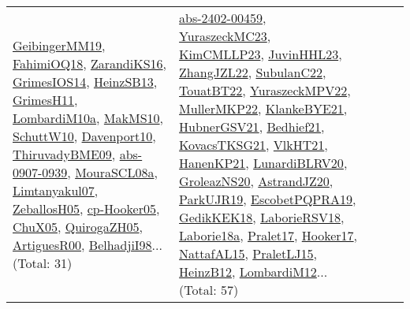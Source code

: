 {\begin{longtable}{lp{3cm}>{\raggedright}p{6cm}>{\raggedright}p{6cm}p{8cm}}
\href{papers/GeibingerMM19.pdf}{GeibingerMM19}\cite{GeibingerMM19}, \href{articles/FahimiOQ18.pdf}{FahimiOQ18}\cite{FahimiOQ18}, \href{articles/ZarandiKS16.pdf}{ZarandiKS16}\cite{ZarandiKS16}, \href{articles/GrimesIOS14.pdf}{GrimesIOS14}\cite{GrimesIOS14}, \href{articles/HeinzSB13.pdf}{HeinzSB13}\cite{HeinzSB13}, \href{papers/GrimesH11.pdf}{GrimesH11}\cite{GrimesH11}, \href{articles/LombardiM10a.pdf}{LombardiM10a}\cite{LombardiM10a}, \href{papers/MakMS10.pdf}{MakMS10}\cite{MakMS10}, \href{papers/SchuttW10.pdf}{SchuttW10}\cite{SchuttW10}, \href{papers/Davenport10.pdf}{Davenport10}\cite{Davenport10}, \href{papers/ThiruvadyBME09.pdf}{ThiruvadyBME09}\cite{ThiruvadyBME09}, \href{articles/abs-0907-0939.pdf}{abs-0907-0939}\cite{abs-0907-0939}, \href{papers/MouraSCL08a.pdf}{MouraSCL08a}\cite{MouraSCL08a}, \href{papers/Limtanyakul07.pdf}{Limtanyakul07}\cite{Limtanyakul07}, \href{articles/ZeballosH05.pdf}{ZeballosH05}\cite{ZeballosH05}, \href{papers/cp-Hooker05.pdf}{cp-Hooker05}\cite{cp-Hooker05}, \href{papers/ChuX05.pdf}{ChuX05}\cite{ChuX05}, \href{papers/QuirogaZH05.pdf}{QuirogaZH05}\cite{QuirogaZH05}, \href{articles/ArtiguesR00.pdf}{ArtiguesR00}\cite{ArtiguesR00}, \href{articles/BelhadjiI98.pdf}{BelhadjiI98}\cite{BelhadjiI98}... (Total: 31) & \href{articles/abs-2402-00459.pdf}{abs-2402-00459}\cite{abs-2402-00459}, \href{papers/YuraszeckMC23.pdf}{YuraszeckMC23}\cite{YuraszeckMC23}, \href{papers/KimCMLLP23.pdf}{KimCMLLP23}\cite{KimCMLLP23}, \href{papers/JuvinHHL23.pdf}{JuvinHHL23}\cite{JuvinHHL23}, \href{papers/ZhangJZL22.pdf}{ZhangJZL22}\cite{ZhangJZL22}, \href{articles/SubulanC22.pdf}{SubulanC22}\cite{SubulanC22}, \href{papers/TouatBT22.pdf}{TouatBT22}\cite{TouatBT22}, \href{articles/YuraszeckMPV22.pdf}{YuraszeckMPV22}\cite{YuraszeckMPV22}, \href{articles/MullerMKP22.pdf}{MullerMKP22}\cite{MullerMKP22}, \href{papers/KlankeBYE21.pdf}{KlankeBYE21}\cite{KlankeBYE21}, \href{articles/HubnerGSV21.pdf}{HubnerGSV21}\cite{HubnerGSV21}, \href{articles/Bedhief21.pdf}{Bedhief21}\cite{Bedhief21}, \href{papers/KovacsTKSG21.pdf}{KovacsTKSG21}\cite{KovacsTKSG21}, \href{articles/VlkHT21.pdf}{VlkHT21}\cite{VlkHT21}, \href{papers/HanenKP21.pdf}{HanenKP21}\cite{HanenKP21}, \href{articles/LunardiBLRV20.pdf}{LunardiBLRV20}\cite{LunardiBLRV20}, \href{papers/GroleazNS20.pdf}{GroleazNS20}\cite{GroleazNS20}, \href{articles/AstrandJZ20.pdf}{AstrandJZ20}\cite{AstrandJZ20}, \href{papers/ParkUJR19.pdf}{ParkUJR19}\cite{ParkUJR19}, \href{articles/EscobetPQPRA19.pdf}{EscobetPQPRA19}\cite{EscobetPQPRA19}, \href{articles/GedikKEK18.pdf}{GedikKEK18}\cite{GedikKEK18}, \href{articles/LaborieRSV18.pdf}{LaborieRSV18}\cite{LaborieRSV18}, \href{papers/Laborie18a.pdf}{Laborie18a}\cite{Laborie18a}, \href{papers/Pralet17.pdf}{Pralet17}\cite{Pralet17}, \href{papers/Hooker17.pdf}{Hooker17}\cite{Hooker17}, \href{articles/NattafAL15.pdf}{NattafAL15}\cite{NattafAL15}, \href{papers/PraletLJ15.pdf}{PraletLJ15}\cite{PraletLJ15}, \href{papers/HeinzB12.pdf}{HeinzB12}\cite{HeinzB12}, \href{articles/LombardiM12.pdf}{LombardiM12}\cite{LombardiM12}... (Total: 57)\\

\end{longtable}}
